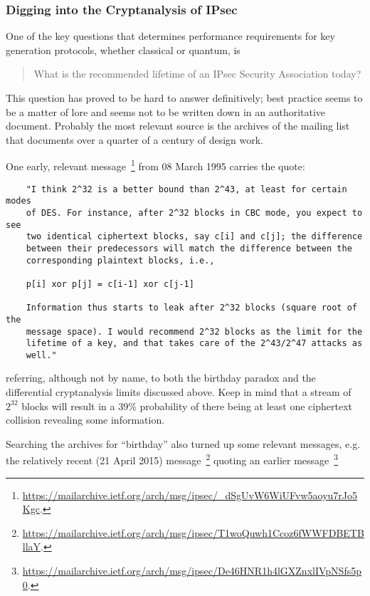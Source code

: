 \subsubsection{Digging into the Cryptanalysis of IPsec}
\label{sec:ipsec-cryptan}


One of the key questions that determines performance requirements for
key generation protocols, whether classical or quantum, is
\begin{quote}
What is the recommended lifetime of an IPsec Security Association
today?
\end{quote}
This question has proved to be hard to answer definitively; best
practice seems to be a matter of lore and seems not to be written down
in an authoritative document.  Probably the most relevant source is
the archives of the mailing list that documents over a quarter of a
century of design work.

One early, relevant message~\footnote{\url{https://mailarchive.ietf.org/arch/msg/ipsec/_dSgUvW6WiUFvw5aoyu7rJo5Kgc}.}
from 08 March 1995 carries the quote:

\begin{widetext}
\begin{verbatim}
	"I think 2^32 is a better bound than 2^43, at least for certain modes
	of DES. For instance, after 2^32 blocks in CBC mode, you expect to see
	two identical ciphertext blocks, say c[i] and c[j]; the difference
	between their predecessors will match the difference between the
	corresponding plaintext blocks, i.e.,

	p[i] xor p[j] = c[i-1] xor c[j-1]

	Information thus starts to leak after 2^32 blocks (square root of the
	message space). I would recommend 2^32 blocks as the limit for the
	lifetime of a key, and that takes care of the 2^43/2^47 attacks as
	well."
\end{verbatim}
\end{widetext}
referring, although not by name, to both the birthday paradox and the
differential cryptanalysis limits discussed above.  Keep in mind that
a stream of $2^{32}$ blocks will result in a 39\% probability of there
being at least one ciphertext collision revealing some information.

Searching the archives for ``birthday'' also turned up some relevant
messages, e.g. the relatively recent (21 April 2015)
message~\footnote{\url{https://mailarchive.ietf.org/arch/msg/ipsec/T1woQuwh1Ccoz6fWWFDBETBllaY}.}
quoting an earlier message~\footnote{\url{https://mailarchive.ietf.org/arch/msg/ipsec/De46HNR1h4lGXZnxlIVpNSfs5p0}.}

